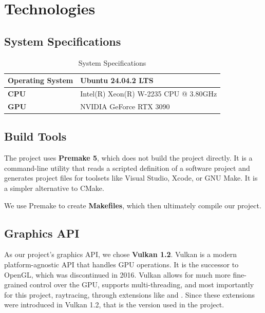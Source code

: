 
\chapter{Technologies}\label{chapter:technologies}

\section{System Specifications}

\begin{table}[h]
\centering
\begin{tabular}{|l|l|}
\hline
\textbf{Operating System} & Ubuntu 24.04.2 LTS \\ \hline
\textbf{CPU}              & Intel(R) Xeon(R) W-2235 CPU @ 3.80GHz \\ \hline
\textbf{GPU}              & NVIDIA GeForce RTX 3090 \\ \hline
\end{tabular}
\caption{System Specifications}
\end{table}

\section{Build Tools}

The project uses \textbf{Premake 5}, which does not build the project directly. It is a command-line utility that reads a scripted definition of a software project and generates project files for toolsets like Visual Studio, Xcode, or GNU Make. It is a simpler alternative to CMake.

We use Premake to create \textbf{Makefiles}, which then ultimately compile our project.

\section{Graphics API}

As our project's graphics API, we chose \textbf{Vulkan 1.2}. Vulkan is a modern platform-agnostic API that handles GPU operations. It is the successor to OpenGL, which was discontinued in 2016. Vulkan allows for much more fine-grained control over the GPU, supports multi-threading, and most importantly for this project, raytracing, through extensions like  and . Since these extensions were introduced in Vulkan 1.2, that is the version used in the project.

